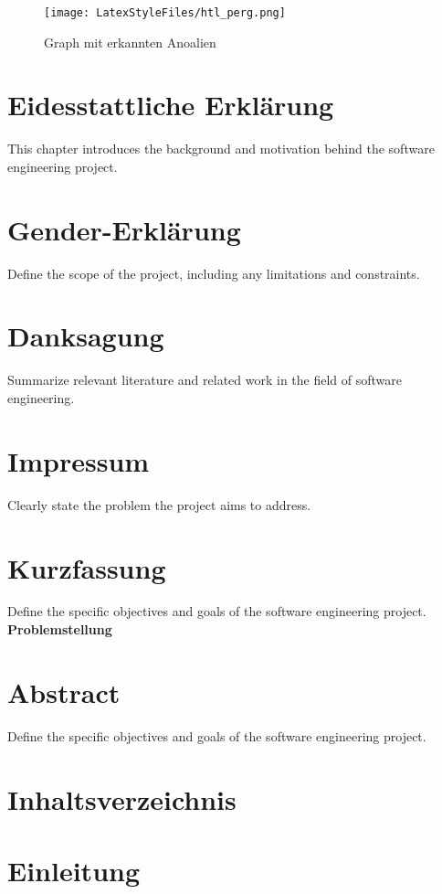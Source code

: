\documentclass{report}
\begin{document}
\begin{figure}[htp]
    \centering
    \texttt{[image: LatexStyleFiles/htl\_perg.png]}
    \caption{Graph mit erkannten Anoalien}
\end{figure}

\tableofcontents

\chapter*{Eidesstattliche Erklärung}
This chapter introduces the background and motivation behind the software engineering project.

\chapter*{Gender-Erklärung}
Define the scope of the project, including any limitations and constraints.

\chapter*{Danksagung}
Summarize relevant literature and related work in the field of software engineering.

\chapter*{Impressum}
Clearly state the problem the project aims to address.

\chapter*{Kurzfassung}
Define the specific objectives and goals of the software engineering project.
\textbf{Problemstellung} 

\chapter*{Abstract}
Define the specific objectives and goals of the software engineering project.

\chapter*{Inhaltsverzeichnis}

\chapter{Einleitung}
\end{document}
